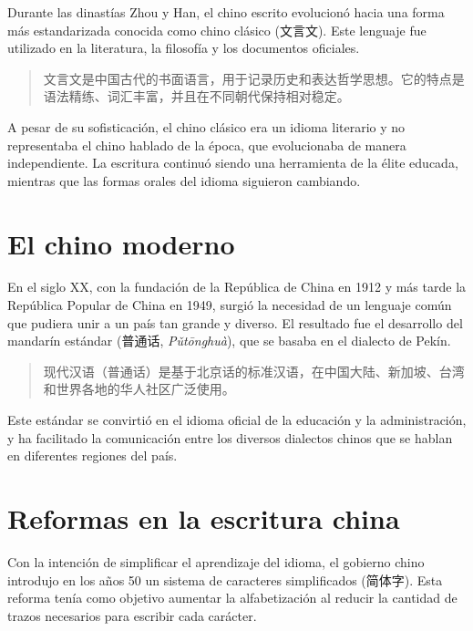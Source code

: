 Durante las dinastías Zhou y Han, el chino escrito evolucionó hacia una forma más estandarizada conocida como chino clásico (\foreignlanguage{chinese}{文言文}). Este lenguaje fue utilizado en la literatura, la filosofía y los documentos oficiales.

\begin{quote}
\foreignlanguage{chinese}{
文言文是中国古代的书面语言，用于记录历史和表达哲学思想。它的特点是语法精练、词汇丰富，并且在不同朝代保持相对稳定。}
\end{quote}

A pesar de su sofisticación, el chino clásico era un idioma literario y no representaba el chino hablado de la época, que evolucionaba de manera independiente. La escritura continuó siendo una herramienta de la élite educada, mientras que las formas orales del idioma siguieron cambiando.

\section{El chino moderno}

En el siglo XX, con la fundación de la República de China en 1912 y más tarde la República Popular de China en 1949, surgió la necesidad de un lenguaje común que pudiera unir a un país tan grande y diverso. El resultado fue el desarrollo del mandarín estándar (\foreignlanguage{chinese}{普通话}, \emph{Pǔtōnghuà}), que se basaba en el dialecto de Pekín.

\begin{quote}
\foreignlanguage{chinese}{
现代汉语（普通话）是基于北京话的标准汉语，在中国大陆、新加坡、台湾和世界各地的华人社区广泛使用。}
\end{quote}

Este estándar se convirtió en el idioma oficial de la educación y la administración, y ha facilitado la comunicación entre los diversos dialectos chinos que se hablan en diferentes regiones del país.

\section{Reformas en la escritura china}

Con la intención de simplificar el aprendizaje del idioma, el gobierno chino introdujo en los años 50 un sistema de caracteres simplificados (\foreignlanguage{chinese}{简体字}). Esta reforma tenía como objetivo aumentar la alfabetización al reducir la cantidad de trazos necesarios para escribir cada carácter.

